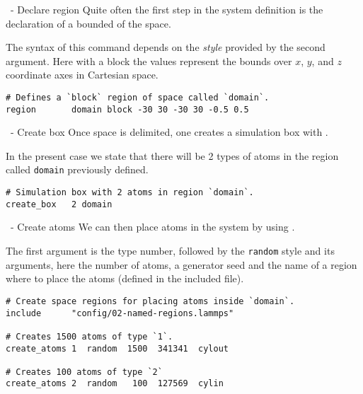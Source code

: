 \begin{frame}[fragile]{\secname}{\subsecname\ - Declare region}
Quite often the first step in the system definition is the declaration of a bounded  of the space.

\vspace{0.5cm}

The syntax of this command depends on the \emph{style} provided by the second argument. Here with a block the values represent the bounds over $x$, $y$, and $z$ coordinate axes in Cartesian space.

\vspace{0.5cm}

\begin{lstlisting}[language=LAMMPS]
# Defines a `block` region of space called `domain`.
region       domain block -30 30 -30 30 -0.5 0.5
\end{lstlisting}
\end{frame}

\begin{frame}[fragile]{\secname}{\subsecname\ - Create box}
Once space is delimited, one creates a simulation box with .

\vspace{0.5cm}

In the present case we state that there will be 2 types of atoms in the region called \Verb|domain| previously defined.

\vspace{0.5cm}

\begin{lstlisting}[language=LAMMPS]
# Simulation box with 2 atoms in region `domain`.
create_box   2 domain
\end{lstlisting}
\end{frame}

\begin{frame}[fragile]{\secname}{\subsecname\ - Create atoms}
We can then place atoms in the system by using .

\vspace{0.5cm}

The first argument is the type number, followed by the \Verb|random| style and its arguments, here the number of atoms, a generator seed and the name of a region where to place the atoms (defined in the included file).
\vspace{0.5cm}

\begin{lstlisting}[language=LAMMPS]
# Create space regions for placing atoms inside `domain`.
include      "config/02-named-regions.lammps"

# Creates 1500 atoms of type `1`.
create_atoms 1  random  1500  341341  cylout

# Creates 100 atoms of type `2`
create_atoms 2  random   100  127569  cylin
\end{lstlisting}
\end{frame}

